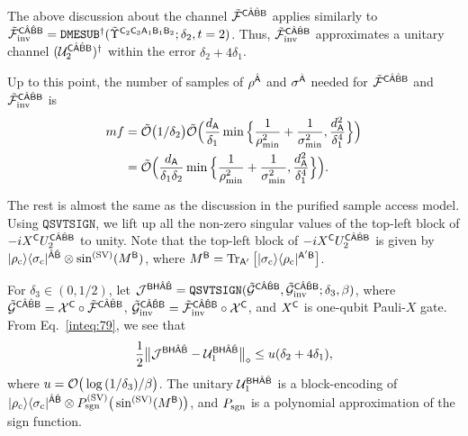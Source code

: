 The above discussion about the channel $\tilde{{\mathcal{F}}}^{{\mathsf{C}}\hat{{\mathsf{A}}}\hat{{\mathsf{B}}}{\mathsf{B}}}$ applies similarly to $\tilde{{\mathcal{F}}}_{\rm inv}^{{\mathsf{C}}\hat{{\mathsf{A}}}\hat{{\mathsf{B}}}{\mathsf{B}}} = \mathtt{DMESUB}^\dag(\tilde{\Upsilon}^{{\mathsf{C}}_2{\mathsf{C}}_3{\mathsf{A}}_1{\mathsf{B}}_1{\mathsf{B}}_2}; \delta_2, t=2)$. Thus, $\tilde{{\mathcal{F}}}_{\rm inv}^{{\mathsf{C}}\hat{{\mathsf{A}}}\hat{{\mathsf{B}}}{\mathsf{B}}}$ approximates a unitary channel $({\mathcal{U}}_2^{{\mathsf{C}}\hat{{\mathsf{A}}}\hat{{\mathsf{B}}}{\mathsf{B}}})^\dag$ within the error $\delta_2 + 4\delta_1$.

Up to this point, the number of samples of $\rho^{\hat{{\mathsf{A}}}}$ and $\sigma^{\hat{{\mathsf{A}}}}$ needed for $\tilde{{\mathcal{F}}}^{{\mathsf{C}}\hat{{\mathsf{A}}}\hat{{\mathsf{B}}}{\mathsf{B}}}$ and $\tilde{{\mathcal{F}}}_{\rm inv}^{{\mathsf{C}}\hat{{\mathsf{A}}}\hat{{\mathsf{B}}}{\mathsf{B}}}$ is
\begin{align}
\label{inteq:99}
    mf 
    &= \tilde{{\mathcal{O}}}\big(1/\delta_2\big)\tilde{{\mathcal{O}}}\Big(\frac{d_{\mathsf{A}}}{\delta_1}\min\Big\{\frac{1}{\rho_{\rm min}^2} + \frac{1}{\sigma_{\rm min}^2}, \frac{d_{\mathsf{A}}^2}{\delta_1^4}\Big\}\Big) \notag\\
    &=\tilde{{\mathcal{O}}}\Big(\frac{d_{\mathsf{A}}}{\delta_1\delta_2}\min\Big\{\frac{1}{\rho_{\rm min}^2} + \frac{1}{\sigma_{\rm min}^2}, \frac{d_{\mathsf{A}}^2}{\delta_1^4}\Big\}\Big).
\end{align}

The rest is almost the same as the discussion in the purified sample access model.
Using $\mathtt{QSVTSIGN}$, we lift up all the non-zero singular values of the top-left block of $-iX^{\mathsf{C}} U_2^{{\mathsf{C}}\hat{{\mathsf{A}}}\hat{{\mathsf{B}}}{\mathsf{B}}}$ to unity.
Note that the top-left block of $-iX^{\mathsf{C}} U_2^{{\mathsf{C}}\hat{{\mathsf{A}}}\hat{{\mathsf{B}}}{\mathsf{B}}}$ is given by $|\rho_{\rm c}\rangle\langle\sigma_{\rm c}|^{\hat{{\mathsf{A}}}\hat{{\mathsf{B}}}} \otimes \sin^{(\rm SV)}(M^{{\mathsf{B}}})$, where $M^{{\mathsf{B}}} = \operatorname{Tr}_{{\mathsf{A}}'}\big[|\sigma_{\rm c}\rangle\langle\rho_{\rm c}|^{{\mathsf{A}}'{\mathsf{B}}}\big]$.


For $\delta_3 \in (0, 1/2)$, let ${\mathcal{J}}^{{\mathsf{B}}{\mathsf{H}}\hat{{\mathsf{A}}}\hat{{\mathsf{B}}}} = \mathtt{QSVTSIGN}(\tilde{{\mathcal{G}}}^{{\mathsf{C}}\hat{{\mathsf{A}}}\hat{{\mathsf{B}}}{\mathsf{B}}}, \tilde{{\mathcal{G}}}_{\rm inv}^{{\mathsf{C}}\hat{{\mathsf{A}}}\hat{{\mathsf{B}}}{\mathsf{B}}}; \delta_3, \beta)$, where $\tilde{{\mathcal{G}}}^{{\mathsf{C}}\hat{{\mathsf{A}}}\hat{{\mathsf{B}}}{\mathsf{B}}} = {\mathcal{X}}^{\mathsf{C}} \circ \tilde{{\mathcal{F}}}^{{\mathsf{C}}\hat{{\mathsf{A}}}\hat{{\mathsf{B}}}{\mathsf{B}}}$, $\tilde{{\mathcal{G}}}_{\rm inv}^{{\mathsf{C}}\hat{{\mathsf{A}}}\hat{{\mathsf{B}}}{\mathsf{B}}} = \tilde{{\mathcal{F}}}_{\rm inv}^{{\mathsf{C}}\hat{{\mathsf{A}}}\hat{{\mathsf{B}}}{\mathsf{B}}}\circ{\mathcal{X}}^{\mathsf{C}}$, and $X^{\mathsf{C}}$ is one-qubit Pauli-$X$ gate.
From Eq.~\eqref{inteq:79}, we see that 
\begin{align}
\label{inteq:78}
    \frac{1}{2}\big\|{\mathcal{J}}^{{\mathsf{B}}{\mathsf{H}}\hat{{\mathsf{A}}}\hat{{\mathsf{B}}}} - {\mathcal{U}}_1^{{\mathsf{B}}{\mathsf{H}}\hat{{\mathsf{A}}}\hat{{\mathsf{B}}}}\big\|_\diamond \leq u(\delta_2 + 4\delta_1),
\end{align}
where $u = {\mathcal{O}}\big(\log{(1/\delta_3)}/\beta\big)$.
The unitary ${\mathcal{U}}_1^{{\mathsf{B}}{\mathsf{H}}\hat{{\mathsf{A}}}\hat{{\mathsf{B}}}}$ is a block-encoding of $|\rho_{\rm c}\rangle\langle\sigma_{\rm c}|^{\hat{{\mathsf{A}}}\hat{{\mathsf{B}}}} \otimes P_{\mathrm{sgn}}^{(\rm SV)}\big(\sin^{(\rm SV)}(M^{\mathsf{B}})\big)$, and $P_{\mathrm{sgn}}$ is a polynomial approximation of the sign function.


